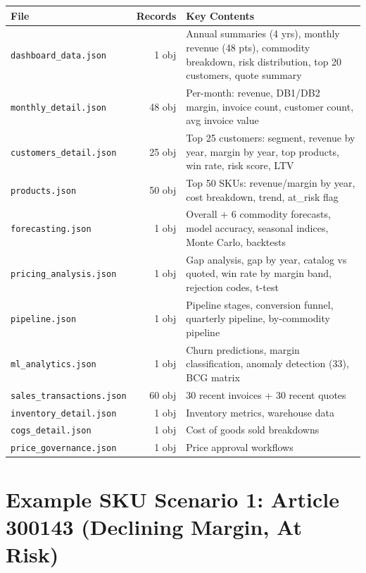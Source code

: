 \documentclass[11pt,a4paper]{article}
\newcommand{\code}[1]{\texttt{#1}}
\begin{document}
\begin{longtable}{l r p{8cm}}
\toprule
\textbf{File} & \textbf{Records} & \textbf{Key Contents} \\
\midrule
\endfirsthead
\code{dashboard\_data.json}    & 1 obj  & Annual summaries (4 yrs), monthly revenue (48 pts), commodity breakdown, risk distribution, top 20 customers, quote summary \\
\code{monthly\_detail.json}    & 48 obj & Per-month: revenue, DB1/DB2 margin, invoice count, customer count, avg invoice value \\
\code{customers\_detail.json}  & 25 obj & Top 25 customers: segment, revenue by year, margin by year, top products, win rate, risk score, LTV \\
\code{products.json}           & 50 obj & Top 50 SKUs: revenue/margin by year, cost breakdown, trend, at\_risk flag \\
\code{forecasting.json}        & 1 obj  & Overall + 6 commodity forecasts, model accuracy, seasonal indices, Monte Carlo, backtests \\
\code{pricing\_analysis.json}  & 1 obj  & Gap analysis, gap by year, catalog vs quoted, win rate by margin band, rejection codes, t-test \\
\code{pipeline.json}           & 1 obj  & Pipeline stages, conversion funnel, quarterly pipeline, by-commodity pipeline \\
\code{ml\_analytics.json}      & 1 obj  & Churn predictions, margin classification, anomaly detection (33), BCG matrix \\
\code{sales\_transactions.json}& 60 obj & 30 recent invoices + 30 recent quotes \\
\code{inventory\_detail.json}  & 1 obj  & Inventory metrics, warehouse data \\
\code{cogs\_detail.json}       & 1 obj  & Cost of goods sold breakdowns \\
\code{price\_governance.json}  & 1 obj  & Price approval workflows \\
\bottomrule
\end{longtable}

\section{Example SKU Scenario 1: Article 300143 (Declining Margin, At Risk)}
\end{document}
